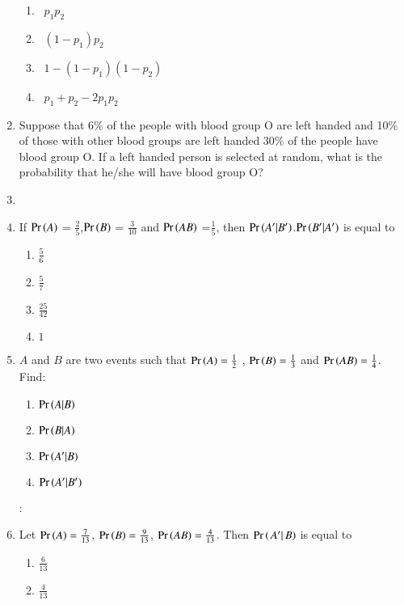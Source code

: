\begin{enumerate}[label=\thesection.\arabic*,ref=\thesection.\theenumi]
\begin{enumerate}
\item \ $p_1 p_2$
\quad\item \ $(1 - p_1) p_2 $
\quad\item \ $1 - (1 - p_1)(1 - p_2)$
\quad\item \ $p_1 + p_2 - 2p_1 p_2$
\end{enumerate}

\item Suppose that 6\% of the people with blood group O are left handed and 10\% of those with other blood groups are left handed 30\% of the people have blood group O. If a left handed person is selected at random, what is the probability that he/she will have blood group O?

\item 
\item If $\Pr\left(A\right)$ = $\frac{2}{5}$,$\Pr\left(B\right)$ = $\frac{3}{10}$ and $\Pr\left(AB\right)$ =$ \frac{1}{5}$, then $\Pr\left(A^{\prime}|B^{\prime}\right)$.$\Pr\left(B^{\prime}|A^{\prime}\right)$ is equal to \\
\begin{enumerate}[label=(\Alph*)]
\item 
$\frac{5}{6}$\\
\item 
$\frac{5}{7}$\\
\item 
$\frac{25}{42}$\\
\item 
$1$

\end{enumerate}
\item $A$ and $B$ are two events such that $\Pr\left(A\right)= \frac{1}{2}$ , $\Pr\left(B\right)= \frac{1}{3}$ and $\Pr\left(AB\right)= \frac{1}{4}$.\\
Find:
\begin{enumerate}[label =\roman*]
\item $\Pr\left(A|B\right)$  \item $\Pr\left(B|A\right)$  \item $\Pr\left(A^{\prime}|B\right)$  \item $\Pr\left(A^{\prime}|B^{\prime}\right)$
\end{enumerate}
\solution:\\

\item Let $\Pr\left(A\right) = \frac{7}{13}$, $\Pr\left(B\right) = \frac{9}{13}$, $\Pr\left(AB\right) = \frac{4}{13}$. Then $\Pr\left(\left.A^{\prime}\right |B\right)$ is equal to
\begin{enumerate}[label=(\alph*)]
\item $\frac{6}{13}$
\item $\frac{4}{13}$

\end{enumerate}
\end{enumerate}
